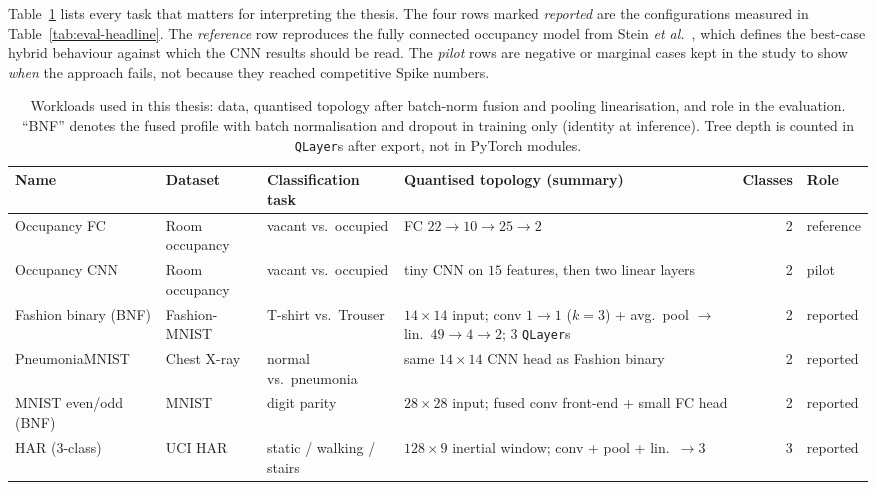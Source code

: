 Table~\ref{tab:eval-workloads} lists every task that matters for interpreting the thesis.
The four rows marked \emph{reported} are the configurations measured in Table~\ref{tab:eval-headline}.
The \emph{reference} row reproduces the fully connected occupancy model from Stein \textit{et al.}~\cite{stein2026nn2logic}, which defines the best-case hybrid behaviour against which the \ac{CNN} results should be read.
The \emph{pilot} rows are negative or marginal cases kept in the study to show \emph{when} the approach fails, not because they reached competitive Spike numbers.

\begin{table}[H]
	\centering
	\small
	\caption{Workloads used in this thesis: data, quantised topology after batch-norm fusion and pooling linearisation, and role in the evaluation.
		``BNF'' denotes the fused profile with batch normalisation and dropout in training only (identity at inference).
		Tree depth is counted in \texttt{QLayer}s after export, not in PyTorch modules.}
	\label{tab:eval-workloads}
	\begin{tabularx}{\textwidth}{@{}>{\raggedright\arraybackslash}p{}>{\raggedright\arraybackslash}p{}>{\raggedright\arraybackslash}p{}>{\raggedright\arraybackslash}p{}r>{\raggedright\arraybackslash}p{}@{}}
		\toprule
		\textbf{Name} & \textbf{Dataset} & \textbf{Classification task} & \textbf{Quantised topology (summary)} & \textbf{Classes} & \textbf{Role} \\
		\midrule
		Occupancy FC & Room occupancy & vacant vs.\ occupied & FC $22{\rightarrow}10{\rightarrow}25{\rightarrow}2$ & 2 & reference \\
		Occupancy CNN & Room occupancy & vacant vs.\ occupied & tiny CNN on $15$ features, then two linear layers & 2 & pilot \\
		Fashion binary (BNF) & Fashion-MNIST & T-shirt vs.\ Trouser & $14{\times}14$ input; conv $1{\rightarrow}1$ ($k{=}3$) + avg.\ pool $\rightarrow$ lin.\ $49{\rightarrow}4{\rightarrow}2$; 3 \texttt{QLayer}s & 2 & reported \\
		PneumoniaMNIST & Chest X-ray & normal vs.\ pneumonia & same $14{\times}14$ CNN head as Fashion binary & 2 & reported \\
		MNIST even/odd (BNF) & MNIST & digit parity & $28{\times}28$ input; fused conv front-end + small FC head & 2 & reported \\
		HAR (3-class) & UCI HAR & static / walking / stairs & $128{\times}9$ inertial window; conv + pool + lin.\ $\rightarrow 3$ & 3 & reported \\

\end{tabularx}
\end{table}

